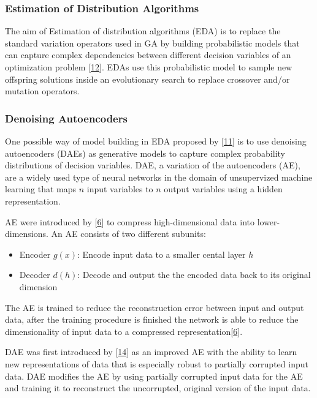 \documentclass[
  11pt,
]{article}
\providecommand{\tightlist}{%
  \setlength{\itemsep}{0pt}\setlength{\parskip}{0pt}}
\begin{document}
\hypertarget{estimation-of-distribution-algorithms}{%
\subsubsection{Estimation of Distribution
Algorithms}\label{estimation-of-distribution-algorithms}}

The aim of Estimation of distribution algorithms (EDA) is to replace the
standard variation operators used in GA by building probabilistic models
that can capture complex dependencies between different decision
variables of an optimization problem
{[}\protect\hyperlink{ref-design_of_modern_heuristics}{12}{]}. EDAs use
this probabilistic model to sample new offspring solutions inside an
evolutionary search to replace crossover and/or mutation operators.

\hypertarget{denoising-autoencoders}{%
\subsubsection{Denoising Autoencoders}\label{denoising-autoencoders}}

One possible way of model building in EDA proposed by
{[}\protect\hyperlink{ref-harmless_overfitting_eda}{11}{]} is to use
denoising autoencoders (DAEs) as generative models to capture complex
probability distributions of decision variables. DAE, a variation of the
autoencoders (AE), are a widely used type of neural networks in the
domain of unsupervized machine learning that maps \(n\) input variables
to \(n\) output variables using a hidden representation.

AE were introduced by {[}\protect\hyperlink{ref-ae_orig}{6}{]} to
compress high-dimensional data into lower-dimensions. An AE consists of
two different subunits:

\begin{itemize}
\tightlist
\item
  Encoder \(g(x)\): Encode input data to a smaller cental layer \(h\)
\item
  Decoder \(d(h)\): Decode and output the the encoded data back to its
  original dimension
\end{itemize}

The AE is trained to reduce the reconstruction error between input and
output data, after the training procedure is finished the network is
able to reduce the dimensionality of input data to a compressed
representation{[}\protect\hyperlink{ref-ae_orig}{6}{]}.

DAE was first introduced by
{[}\protect\hyperlink{ref-10.1145ux2f1390156.1390294}{14}{]} as an
improved AE with the ability to learn new representations of data that
is especially robust to partially corrupted input data. DAE modifies the
AE by using partially corrupted input data for the AE and training it to
reconstruct the uncorrupted, original version of the input data.
\end{document}
